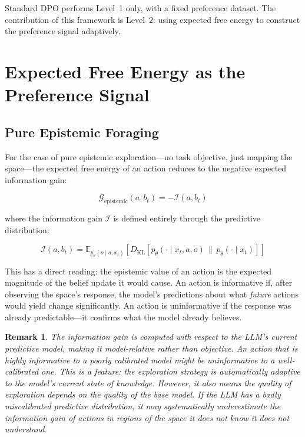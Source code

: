 \documentclass[11pt]{article}
\newtheorem{remark}{Remark}
\newcommand{\EFE}{\mathcal{G}}
\newcommand{\KL}[2]{D_{\mathrm{KL}}\!\left[#1 \,\|\, #2\right]}
\newcommand{\Esub}[2]{\mathbb{E}_{#1}\!\left[#2\right]}
\begin{document}
Standard DPO performs Level~1 only, with a fixed preference dataset. The contribution of this framework is Level~2: using expected free energy to construct the preference signal adaptively.


\section{Expected Free Energy as the Preference Signal}
\label{sec:efe}

\subsection{Pure Epistemic Foraging}

For the case of pure epistemic exploration---no task objective, just mapping the space---the expected free energy of an action reduces to the negative expected information gain:

\begin{equation}
\label{eq:efe-epistemic}
\EFE_{\mathrm{epistemic}}(a, b_t) = -\mathcal{I}(a, b_t)
\end{equation}

where the information gain $\mathcal{I}$ is defined entirely through the predictive distribution:

\begin{equation}
\label{eq:info-gain}
\mathcal{I}(a, b_t) = \Esub{p_\theta(o \mid a, x_t)}{\KL{p_\theta(\cdot \mid x_t, a, o)}{p_\theta(\cdot \mid x_t)}}
\end{equation}

This has a direct reading: the epistemic value of an action is the expected magnitude of the belief update it would cause. An action is informative if, after observing the space's response, the model's predictions about what \emph{future} actions would yield change significantly. An action is uninformative if the response was already predictable---it confirms what the model already believes.

\begin{remark}
\label{rem:model-relative}
The information gain is computed with respect to the LLM's \emph{current} predictive model, making it model-relative rather than objective. An action that is highly informative to a poorly calibrated model might be uninformative to a well-calibrated one. This is a feature: the exploration strategy is automatically adaptive to the model's current state of knowledge. However, it also means the quality of exploration depends on the quality of the base model. If the LLM has a badly miscalibrated predictive distribution, it may systematically underestimate the information gain of actions in regions of the space it does not know it does not understand.
\end{remark}
\end{document}
